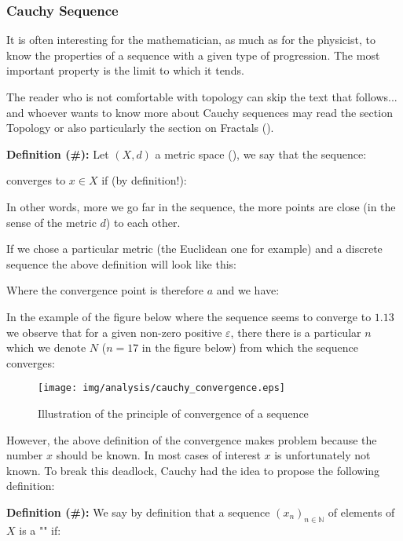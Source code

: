 	\subsubsection{Cauchy Sequence}

It is often interesting for the mathematician, as much as for the physicist, to know the properties of a sequence with a given type of progression. The most important property is the limit to which it tends.

	\begin{tcolorbox}[title=Remark,colframe=black,arc=10pt]
The reader who is not comfortable with topology can skip the text that follows... and whoever wants to know more about Cauchy sequences may read the section Topology or also particularly the section on Fractals ().
	\end{tcolorbox}

\textbf{Definition (\#\mydef):} Let $(X, d)$ a metric space (), we say that the sequence:
	
converges to $x \in X$ if (by definition!):
	
In other words, more we go far in the sequence, the more points are close (in the sense of the metric $d$) to each other.

If we chose a particular metric (the Euclidean one for example) and a discrete sequence the above definition will look like this:
	
	Where the convergence point is therefore $a$ and we have:
	
	In the example of the figure below where the sequence seems to converge to $1.13$ we observe that for a given non-zero positive $\varepsilon$, there there is a particular $n$ which we denote $N$ ($n=17$ in the figure below) from which the sequence converges:
	\begin{figure}[H]
		\centering
		\texttt{[image: img/analysis/cauchy\_convergence.eps]}
		\caption{Illustration of the principle of convergence of a sequence}
	\end{figure}

	However, the above definition of the convergence makes problem because the number $x$ should be known. In most cases of interest $x$ is unfortunately not known. To break this deadlock, Cauchy had the idea to propose the following definition:

	\textbf{Definition (\#\mydef):} We say by definition that a sequence $(x_n)_{n \in \mathbb{N}}$ of elements of $X$ is a "" if:
	
